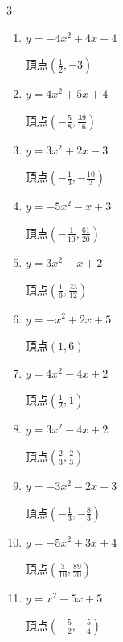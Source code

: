 \begin{multicols}{3}
\begin{enumerate}
  \item $\displaystyle y=-4x^{2}+4x-4$

        $\displaystyle 頂点\left( \frac{1}{2} , -3 \right)$

  \item $\displaystyle y=4x^{2}+5x+4$

        $\displaystyle 頂点\left( -\frac{5}{8} , \frac{39}{16} \right)$

  \item $\displaystyle y=3x^{2}+2x-3$

        $\displaystyle 頂点\left( -\frac{1}{3} , -\frac{10}{3} \right)$

\columnbreak %

  \item $\displaystyle y=-5x^{2}-x+3$

        $\displaystyle 頂点\left( -\frac{1}{10} , \frac{61}{20} \right)$

  \item $\displaystyle y=3x^{2}-x+2$

        $\displaystyle 頂点\left( \frac{1}{6} , \frac{23}{12} \right)$

  \item $\displaystyle y=-x^{2}+2x+5$

        $\displaystyle 頂点\left( 1 , 6 \right)$

  \item $\displaystyle y=4x^{2}-4x+2$

        $\displaystyle 頂点\left( \frac{1}{2} , 1 \right)$

  \item $\displaystyle y=3x^{2}-4x+2$

        $\displaystyle 頂点\left( \frac{2}{3} , \frac{2}{3} \right)$

\columnbreak %

\resetques

  \item $\displaystyle y=-3x^{2}-2x-3$

        $\displaystyle 頂点\left( -\frac{1}{3} , -\frac{8}{3} \right)$

  \item $\displaystyle y=-5x^{2}+3x+4$

        $\displaystyle 頂点\left( \frac{3}{10} , \frac{89}{20} \right)$

  \item $\displaystyle y=x^{2}+5x+5$

        $\displaystyle 頂点\left( -\frac{5}{2} , -\frac{5}{4} \right)$


\end{enumerate}
\end{multicols}
